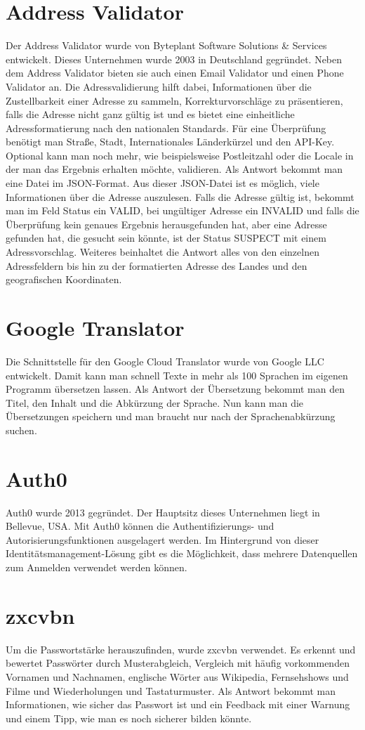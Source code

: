 \section{Address Validator}
Der Address Validator wurde von Byteplant Software Solutions \& Services entwickelt. Dieses Unternehmen wurde 2003 in Deutschland gegründet. Neben dem Address Validator bieten sie auch einen Email Validator und einen Phone Validator an. Die Adressvalidierung hilft dabei, Informationen über die Zustellbarkeit einer Adresse zu sammeln, Korrekturvorschläge zu präsentieren, falls die Adresse nicht ganz gültig ist und es bietet eine einheitliche Adressformatierung nach den nationalen Standards. Für eine Überprüfung benötigt man Straße, Stadt, Internationales Länderkürzel und den API-Key. Optional kann man noch mehr, wie beispielsweise Postleitzahl oder die Locale in der man das Ergebnis erhalten möchte, validieren. Als Antwort bekommt man eine Datei im JSON-Format. Aus dieser JSON-Datei ist es möglich, viele Informationen über die Adresse auszulesen. Falls die Adresse gültig ist, bekommt man im Feld Status ein VALID, bei ungültiger Adresse ein INVALID und falls die Überprüfung kein genaues Ergebnis herausgefunden hat, aber eine Adresse gefunden hat, die gesucht sein könnte, ist der Status SUSPECT mit einem Adressvorschlag. Weiteres beinhaltet die Antwort alles von den einzelnen Adressfeldern bis hin zu der formatierten Adresse des Landes und den geografischen Koordinaten. \cite{addressValidator}

\section{Google Translator}
Die Schnittstelle für den Google Cloud Translator wurde von Google LLC entwickelt. Damit kann man schnell Texte in mehr als 100 Sprachen im eigenen Programm übersetzen lassen. Als Antwort der Übersetzung bekommt man den Titel, den Inhalt und die Abkürzung der Sprache. Nun kann man die Übersetzungen speichern und man braucht nur nach der Sprachenabkürzung suchen.
\cite{googleTranslator}

\section{Auth0}
Auth0 wurde 2013 gegründet. Der Hauptsitz dieses Unternehmen liegt in Bellevue, USA. Mit Auth0 können die Authentifizierungs- und Autorisierungsfunktionen ausgelagert werden. Im Hintergrund von dieser Identitätsmanagement-Lösung gibt es die Möglichkeit, dass mehrere Datenquellen zum Anmelden verwendet werden können. \autocite{auth0}

\section{zxcvbn}
Um die Passwortstärke herauszufinden, wurde zxcvbn verwendet. Es erkennt und bewertet Passwörter durch Musterabgleich, Vergleich mit häufig vorkommenden Vornamen und Nachnamen, englische Wörter aus Wikipedia, Fernsehshows und Filme und Wiederholungen und Tastaturmuster. Als Antwort bekommt man Informationen, wie sicher das Passwort ist und ein Feedback mit einer Warnung und einem Tipp, wie man es noch sicherer bilden könnte. \autocite{zxcvbn}